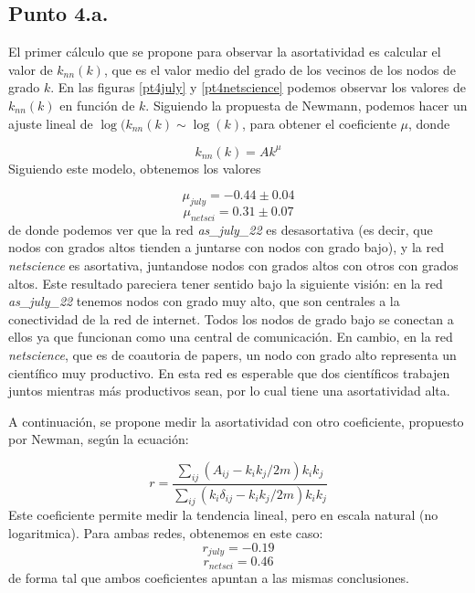 \documentclass{article}
\begin{document}
\subsection{Punto 4.a.}
El primer cálculo que se propone para observar la asortatividad es calcular el valor de $k_{nn}(k)$, que es el valor medio del grado de los vecinos de los nodos de grado $k$. En las figuras \ref{pt4july} y \ref{pt4netscience} podemos observar los valores de $k_{nn}(k)$ en función de $k$. Siguiendo la propuesta de Newmann, podemos hacer un ajuste lineal de $\log(k_{nn}(k) \sim \log (k)$, para obtener el coeficiente $\mu$, donde

\begin{equation}
k_{nn}(k) = A k^\mu
\end{equation}
Siguiendo este modelo, obtenemos los valores 

\begin{equation}
\mu_{july} = -0.44 \pm 0.04
\end{equation}
\begin{equation}
\mu_{netsci} = 0.31 \pm 0.07 
\end{equation}
de donde podemos ver que la red \textit{as\_july\_22} es desasortativa (es decir, que nodos con grados altos tienden a juntarse con nodos con grado bajo), y la red \textit{netscience} es asortativa, juntandose nodos con grados altos con otros con grados altos. Este resultado pareciera tener sentido bajo la siguiente visión: en la red \textit{as\_july\_22} tenemos nodos con grado muy alto, que son centrales a la conectividad de la red de internet. Todos los nodos de grado bajo se conectan a ellos ya que funcionan como una central de comunicación. En cambio, en la red \textit{netscience}, que es de coautoria de papers, un nodo con grado alto representa un científico muy productivo. En esta red es esperable que dos científicos trabajen juntos mientras más productivos sean, por lo cual tiene una asortatividad alta.

A continuación, se propone medir la asortatividad con otro coeficiente, propuesto por Newman, según la ecuación:

\begin{equation}
r = \frac{\sum_{ij}(A_{ij}-k_i k_j/2m)k_i k_j}{\sum_{ij}(k_i\delta_{ij} -k_i k_j /2m)k_i k_j}
\end{equation}
Este coeficiente permite medir la tendencia lineal, pero en escala natural (no logaritmica). Para ambas redes, obtenemos en este caso:
\begin{equation}
r_{july} = -0.19
\end{equation}
\begin{equation}
r_{netsci} = 0.46 
\end{equation}
de forma tal que ambos coeficientes apuntan a las mismas conclusiones.
\end{document}
